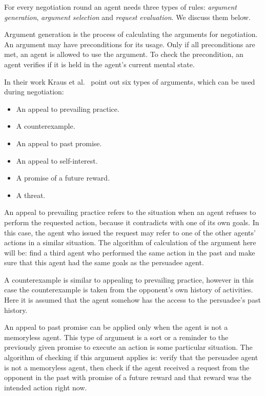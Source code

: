 For every negotiation round an agent needs three types of rules: \emph{argument generation}, \emph{argument selection} and \emph{request evaluation}.
We discuss them below.

Argument generation is the process of calculating the arguments for negotiation.
An argument may have preconditions for its usage.
Only if all preconditions are met, an agent is allowed to use the argument.
To check the precondition, an agent verifies if it is held in the agent's current mental state.

In their work Kraus et al.~\cite{Kraus_98} point out six types of arguments, which can be used during negotiation:
\begin{itemize}
  \item An appeal to prevailing practice.
  \item A counterexample.
  \item An appeal to past promise.
  \item An appeal to self-interest.
  \item A promise of a future reward.
  \item A threat.
\end{itemize}

An appeal to prevailing practice refers to the situation when an agent refuses to perform the requested action, because it contradicts with one of its own goals.
In this case, the agent who issued the request may refer to one of the other agents' actions in a similar situation.
The algorithm of calculation of the argument here will be: find a third agent who performed the same action in the past and make sure that this agent had the same goals as the persuadee agent.

A counterexample is similar to appealing to prevailing practice, however in this case the counterexample is taken from the opponent's own history of activities.
Here it is assumed that the agent somehow has the access to the persuadee's past history.

An appeal to past promise can be applied only when the agent is not a memoryless agent.
This type of argument is a sort or a reminder to the previously given promise to execute an action is some particular situation.
The algorithm of checking if this argument applies is: verify that the persuadee agent is not a memoryless agent, then check if the agent received a request from the opponent in the past with promise of a future reward and that reward was the intended action right now.

